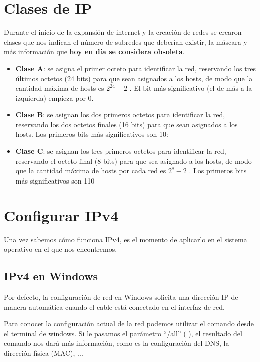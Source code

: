 \section{Clases de IP}
Durante el inicio de la expansión de internet y la creación de redes se crearon clases que nos indican el número de subredes que deberían existir, la máscara y más información que \textbf{hoy en día se considera obsoleta}.

\begin{itemize}
    \item \textbf{Clase A}: se asigna el primer octeto para identificar la red, reservando los tres últimos octetos (24 bits) para que sean asignados a los hosts, de modo que la cantidad máxima de hosts es $2^{24} - 2$ . El bit más significativo (el de más a la izquierda) empieza por 0.

    \item \textbf{Clase B}: se asignan los dos primeros octetos para identificar la red, reservando los dos octetos finales (16 bits) para que sean asignados a los hosts. Los primeros bits más significativos son 10:

    \item \textbf{Clase C}: se asignan los tres primeros octetos para identificar la red, reservando el octeto final (8 bits) para que sea asignado a los hosts, de modo que la cantidad máxima de hosts por cada red es $2^{8} - 2$ . Los primeros bits más significativos son 110
\end{itemize}

\section{Configurar IPv4}

Una vez sabemos cómo funciona IPv4, es el momento de aplicarlo en el sistema operativo en el que nos encontremos.

\subsection{IPv4 en Windows}

Por defecto, la configuración de red en Windows solicita una dirección IP de manera automática cuando el cable está conectado en el interfaz de red.

Para conocer la configuración actual de la red podemos utilizar el comando  desde el terminal de windows. Si le pasamos el parámetro “/all” (  ), el resultado del comando nos dará más información, como es la configuración del DNS, la dirección física (MAC), ...

